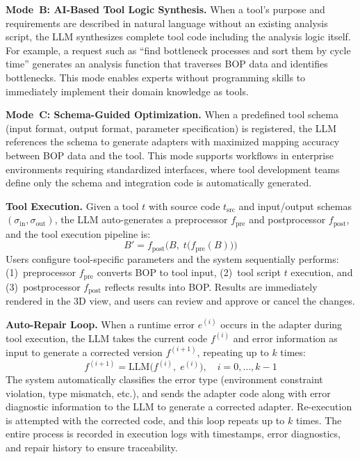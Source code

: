 \documentclass[conference]{IEEEtran}
\begin{document}
\textbf{Mode~B: AI-Based Tool Logic Synthesis.}
When a tool's purpose and requirements are described in natural language without an existing analysis script, the LLM synthesizes complete tool code including the analysis logic itself. For example, a request such as ``find bottleneck processes and sort them by cycle time'' generates an analysis function that traverses BOP data and identifies bottlenecks. This mode enables experts without programming skills to immediately implement their domain knowledge as tools.

\textbf{Mode~C: Schema-Guided Optimization.}
When a predefined tool schema (input format, output format, parameter specification) is registered, the LLM references the schema to generate adapters with maximized mapping accuracy between BOP data and the tool. This mode supports workflows in enterprise environments requiring standardized interfaces, where tool development teams define only the schema and integration code is automatically generated.

\textbf{Tool Execution.}
Given a tool $t$ with source code $t_{\mathrm{src}}$ and input/output schemas $(\sigma_{\mathrm{in}}, \sigma_{\mathrm{out}})$, the LLM auto-generates a preprocessor $f_{\mathrm{pre}}$ and postprocessor $f_{\mathrm{post}}$, and the tool execution pipeline is:
\begin{equation}
B' = f_{\mathrm{post}}\bigl(B,\; t\bigl(f_{\mathrm{pre}}(B)\bigr)\bigr)
\label{eq:step2}
\end{equation}
Users configure tool-specific parameters and the system sequentially performs: (1)~preprocessor $f_{\mathrm{pre}}$ converts BOP to tool input, (2)~tool script $t$ execution, and (3)~postprocessor $f_{\mathrm{post}}$ reflects results into BOP. Results are immediately rendered in the 3D view, and users can review and approve or cancel the changes.

\textbf{Auto-Repair Loop.}
When a runtime error $e^{(i)}$ occurs in the adapter during tool execution, the LLM takes the current code $f^{(i)}$ and error information as input to generate a corrected version $f^{(i+1)}$, repeating up to $k$ times:
\begin{equation}
f^{(i+1)} = \mathrm{LLM}\bigl(f^{(i)},\; e^{(i)}\bigr), \quad i = 0, \ldots, k{-}1
\label{eq:repair}
\end{equation}
The system automatically classifies the error type (environment constraint violation, type mismatch, etc.), and sends the adapter code along with error diagnostic information to the LLM to generate a corrected adapter. Re-execution is attempted with the corrected code, and this loop repeats up to $k$ times. The entire process is recorded in execution logs with timestamps, error diagnostics, and repair history to ensure traceability.
\end{document}

